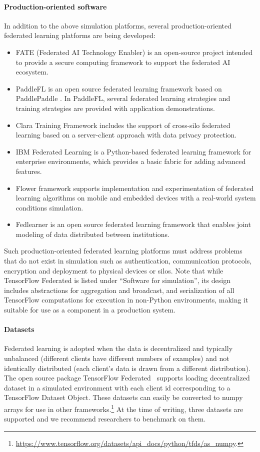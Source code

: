 \paragraph{Production-oriented software} In addition to the above simulation platforms, several production-oriented federated learning platforms are being developed:
\begin{itemize}
    \item FATE (Federated AI Technology Enabler) \citep{FATE} is an open-source project intended to provide a secure computing framework to support the federated AI ecosystem.
    \item PaddleFL \citep{PaddleFL} is an open source federated learning framework based on PaddlePaddle \citep{PaddlePaddle}. In PaddleFL, several federated learning strategies and training strategies are provided with application demonstrations.
    \item Clara Training Framework \citep{ClaraTraining} includes the support of cross-silo federated learning based on a server-client approach with data privacy protection.
    \item IBM Federated Learning \citep{IBMFL} is a Python-based federated learning framework for enterprise environments, which provides a basic fabric for adding advanced features.
    \item Flower framework \citep{beutel2020flower} supports implementation and experimentation of federated learning algorithms on mobile and embedded devices with a real-world system conditions simulation.
    \item Fedlearner \citep{Fedlearner} is an open source federated learning framework that enables joint modeling of data distributed between institutions.
\end{itemize}
Such production-oriented federated learning platforms must address problems that do not exist in simulation such as authentication, communication protocols, encryption and deployment to physical devices or silos. Note that while TensorFlow Federated is listed under ``Software for simulation'', its design includes abstractions for aggregation and broadcast, and serialization of all TensorFlow computations for execution in non-Python environments, making it suitable for use as a component in a production system.


\paragraph{Datasets} Federated learning is adopted when the data is decentralized and typically unbalanced (different clients have different numbers of examples) and not identically distributed (each client's data is drawn from a different distribution). The open source package TensorFlow Federated~\citep{tff} supports loading decentralized dataset in a simulated environment with each client id corresponding to a TensorFlow Dataset Object. These datasets can easily be converted to numpy arrays for use in other frameworks.\footnote{\url{https://www.tensorflow.org/datasets/api_docs/python/tfds/as_numpy}.} At the time of writing, three datasets are supported and we recommend researchers to benchmark on them.

